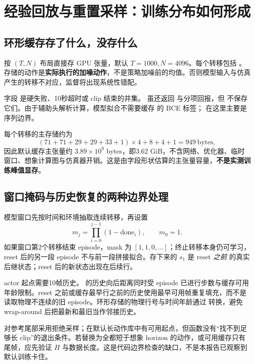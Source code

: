 \section{经验回放与重置采样：训练分布如何形成}
\subsection{环形缓存存了什么，没存什么}
 按 $(T,N)$ 布局直接存 GPU 张量，默认 $T=1000,N=4096$。每个转移包括 。存储的动作是\textbf{实际执行的加噪动作}，不是策略加噪前的均值。否则模型输入与仿真产生的转移不对应，监督将出现系统性错配。

字段  是硬失败、10秒超时或 clip 结束的并集。 虽还返回  与分项回报，但  不保存它们。由于辅助头解析计算，模型拟合不需要缓存  的 BCE 标签； 在这里主要是序列边界。

每个转移的主存储约为
\begin{equation}
 (71+71+29+29+33+1)\times4+8+4+1=949\ \text{bytes},
\end{equation}
因此默认缓存主张量约 $3.89\times10^9$ bytes，即3.62 GiB，不含网络、优化器、临时窗口、想象计算图与仿真器开销。这是由字段形状估算的主张量容量，\textbf{不是实测训练峰值显存}。

\subsection{窗口掩码与历史恢复的两种边界处理}
模型窗口先按时间和环境抽取连续转移，再设置
\begin{equation}
 m_j=\prod_{i=0}^{j-1}(1-\mathrm{done}_i),\qquad m_0=1.
\end{equation}
如果窗口第2个转移结束 episode，mask 为 $[1,1,0,\ldots]$；终止转移本身仍可学习，reset 后的另一段 episode 不与前一段拼接拟合。存下来的 $s_1$ 是 reset \emph{之前} 的真实后继状态；reset 后的新状态出现在后续行。

actor 起点需要10帧历史。 的历史向后距离同时受 episode 已进行步数与缓存可用年龄限制。reset 之前或缓存最早行之前的历史使用最早可用帧重复填充，而不是读取物理不连续的旧 episode。环形存储的物理行号与时间年龄通过  转换，避免 wrap-around 后把最新和最旧当作邻接历史。

 对参考尾部采用拒绝采样；在默认长动作库中有可用起点，但函数没有“找不到足够长 clip”的退出条件。若替换为全都短于想象 horizon 的动作，或可用缓存只有尾帧，应先验证 $H$ 与数据长度。这是代码边界检查的缺口，不是本报告已观察到默认训练卡住。

